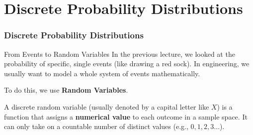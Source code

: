 
\part{Discrete Probability Distributions}



\section{Discrete Probability Distributions}

\begin{frame}{From Events to Random Variables}
    In the previous lecture, we looked at the probability of specific, single events (like drawing a red sock). In engineering, we usually want to model a whole system of events mathematically. 
    
    To do this, we use \textbf{Random Variables}.
    
    \vspace{0.3cm}
    \begin{definition}
        A discrete random variable (usually denoted by a capital letter like $X$) is a function that assigns a \textbf{numerical value} to each outcome in a sample space. It can only take on a countable number of distinct values (e.g., $0, 1, 2, 3\dots$).
    \end{definition}

\end{frame}

